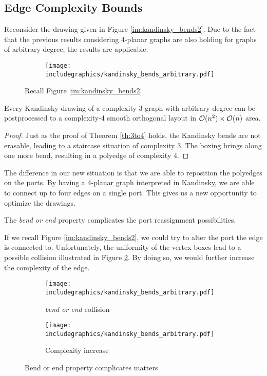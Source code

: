 \subsection{Edge Complexity Bounds}
Reconsider the drawing given in Figure \ref{im:kandinsky_bends2}. Due to the fact that the previous results considering 4-planar graphs are also holding for graphs of arbitrary degree, the results are applicable.\\
\begin{figure}[H]
	\centering
	\begin{subfigure}{0.6\linewidth}
		\centering
		\texttt{[image: includegraphics/kandinsky\_bends\_arbitrary.pdf]}
	\end{subfigure}
	\caption{Recall Figure \ref{im:kandinsky_bends2}}\label{im:recall1}
\end{figure}
\begin{theorem}
	Every Kandinsky drawing of a complexity-3 graph with arbitrary degree can be postprocessed to a complexity-4 smooth orthogonal layout in $\mathcal{O}(n^2)\times\mathcal{O}(n)$ area.
\end{theorem}
\begin{proof}
	Just as the proof of Theorem \ref{th:3to4} holds, the Kandinsky bends are not erasable, leading to a staircase situation of complexity 3. The boxing brings along one more bend, resulting in a polyedge of complexity 4.
\end{proof}
The difference in our new situation is that we are able to reposition the polyedges on the ports. By having a 4-planar graph interpreted in Kandinsky, we are able to connect up to four edges on a single port. This gives us a new opportunity to optimize the drawings.
\begin{remark}
	The \textit{bend or end} property complicates the port reassignment possibilities.
\end{remark}
If we recall Figure \ref{im:kandinsky_bends2}, we could try to alter the port the edge is connected to. Unfortunately, the uniformity of the vertex boxes lead to a possible collision illustrated in Figure \ref{im:bend_or_end_collision}. By doing so, we would further increase the complexity of the edge.
\begin{figure}[H]
	\centering
	\begin{subfigure}{0.3\linewidth}
		\centering
		\texttt{[image: includegraphics/kandinsky\_bends\_arbitrary.pdf]}
		\caption{\textit{bend or end} collision}\label{im:bend_or_end_collision}
	\end{subfigure}
	\begin{subfigure}{0.3\linewidth}
		\centering
		\texttt{[image: includegraphics/kandinsky\_bends\_arbitrary.pdf]}
		\caption{Complexity increase}\label{im:bend_or_end_comp_increase}
	\end{subfigure}
	\caption{Bend or end property complicates matters}\label{im:bend_or_end}
\end{figure}
